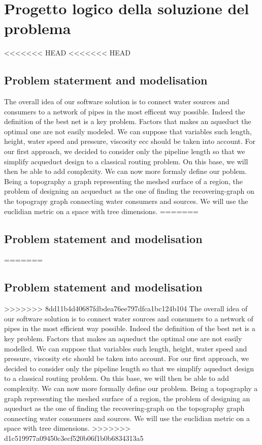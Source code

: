 \chapter{Progetto logico della soluzione del problema}
\label{capitolo4}
\thispagestyle{empty}

<<<<<<< HEAD
<<<<<<< HEAD
\section{Problem staterment and modelisation}
The overall idea of our software solution is to connect water sources and consumers to a network of 
pipes in the most efficent way possible. Indeed the definition of the best net is a key problem. 
Factors that makes an aqueduct the optimal one are not easily modeled. We can suppose that variables 
such length, height, water speed and pressure, viscosity ecc should be taken into account.
\hfill For our first approach, we decided to consider only the pipeline length so that we simplify 
acqueduct design to a classical routing problem. On this base, we will then be able to add complexity.
\hfill We can now more formaly define our poblem. Being a topography a graph representing the meshed 
surface of a region, the problem of designing an acqueduct as the one of finding the recovering-graph 
on the topograpy graph connecting water consumers and sources. We will use the euclidian metric on a 
space with tree dimensions.
=======
\section {Problem statement and modelisation}
=======
\section{Problem statement and modelisation}
>>>>>>> 8dd11b4d40687fdbdea76ee797dfca1bc124b104
The overall idea of our software solution is to connect water sources and consumers to a network of pipes in the most efficient way possible. Indeed the definition of the best net is a key problem. Factors that makes an aqueduct the optimal one are not easily modelled. We can suppose that variables such length, height, water speed and pressure, viscosity etc should be taken into account.
\hfill For our first approach, we decided to consider only the pipeline length so that we simplify aqueduct design to a classical routing problem. On this base, we will then be able to add complexity.
\hfill We can now more formally define our problem. Being a topography a graph representing the meshed surface of a region, the problem of designing an aqueduct as the one of finding the recovering-graph on the topography graph connecting water consumers and sources. We will use the euclidian metric on a space with tree dimensions.
>>>>>>> d1c519977a09450c3ecf520b06f1b0b6834313a5

